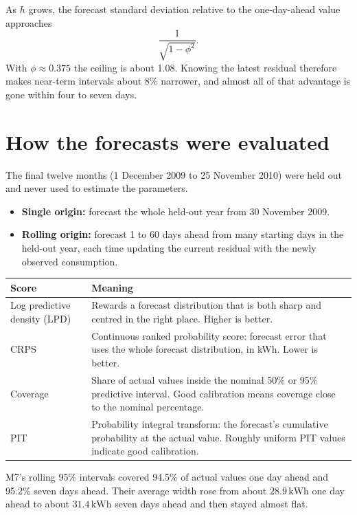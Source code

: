\documentclass[11pt]{article}
\makeatletter
\newcommand{\kwh}{\,\mathrm{kWh}}
\newenvironment{reftable}[3]
  {\par\nopagebreak\addvspace{4pt}\noindent
   \renewcommand{\arraystretch}{1.3}%
   \begin{tabular}{@{}>{\raggedright\arraybackslash}p{#1\textwidth}
                      >{\raggedright\arraybackslash}p{\dimexpr0.97\textwidth-#1\textwidth-2\tabcolsep\relax}@{}}
   \toprule \textbf{#2} & \textbf{#3} \\ \midrule}
  {\bottomrule\end{tabular}\par\addvspace{8pt}}
\makeatother
\begin{document}
As $h$ grows, the forecast standard deviation relative to the one-day-ahead
value approaches
\begin{equation}
\frac{1}{\sqrt{1-\phi^2}} .
\label{eq:ceiling}
\end{equation}
With $\phi \approx 0.375$ the ceiling is about 1.08. Knowing the latest residual
therefore makes near-term intervals about 8\% narrower, and almost all of that
advantage is gone within four to seven days.

\section{How the forecasts were evaluated}

The final twelve months (1 December 2009 to 25 November 2010) were held out and
never used to estimate the parameters.
\begin{itemize}[leftmargin=*]
\item \textbf{Single origin:} forecast the whole held-out year from 30 November
  2009.
\item \textbf{Rolling origin:} forecast 1 to 60 days ahead from many starting
  days in the held-out year, each time updating the current residual with the
  newly observed consumption.
\end{itemize}

\begin{reftable}{0.3}{Score}{Meaning}
Log predictive density (LPD) & Rewards a forecast distribution that is both sharp and centred in the right place. Higher is better. \\
CRPS & Continuous ranked probability score: forecast error that uses the whole forecast distribution, in kWh. Lower is better. \\
Coverage & Share of actual values inside the nominal 50\% or 95\% predictive interval. Good calibration means coverage close to the nominal percentage. \\
PIT & Probability integral transform: the forecast's cumulative probability at the actual value. Roughly uniform PIT values indicate good calibration. \\
\end{reftable}

M7's rolling 95\% intervals covered 94.5\% of actual values one day ahead and
95.2\% seven days ahead. Their average width rose from about $28.9\kwh$ one day
ahead to about $31.4\kwh$ seven days ahead and then stayed almost flat.
\end{document}
